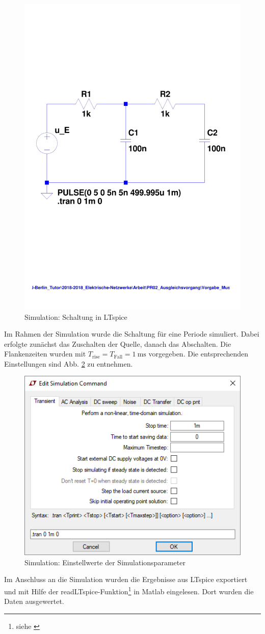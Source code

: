 \begin{figure}[H]
  \centering
  \includegraphics[width=0.6\linewidth]{src/3_Sim_Schaltung.pdf}
  \caption{Simulation: Schaltung in LTspice}
  \label{fig:3_Sim_Schaltung}
\end{figure}
%
Im Rahmen der Simulation wurde die Schaltung für eine Periode simuliert. Dabei erfolgte zunächst das Zuschalten der Quelle, danach das Abschalten. Die Flankenzeiten wurden mit $T_\mathrm{rise} = T_\mathrm{Fall} = \SI{1}{\milli\second}$ vorgegeben. Die entsprechenden Einstellungen sind Abb. \ref{fig:3_Sim_Parameter} zu entnehmen.
%
\begin{figure}[H]
  \centering
  \includegraphics[width=0.7\linewidth]{src/3_Sim_Parameter.png}
  \caption{Simulation: Einstellwerte der Simulationsparameter}
  \label{fig:3_Sim_Parameter}
\end{figure}
%
Im Anschluss an die Simulation wurden die Ergebnisse aus LTspice exportiert und mit Hilfe der readLTspice-Funktion\footnote{siehe \cite{src:readLTspice}} in Matlab eingelesen. Dort wurden die Daten ausgewertet.
%
%
%